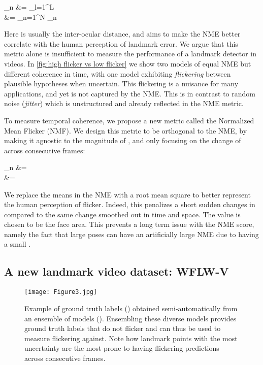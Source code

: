 \documentclass[10pt,twocolumn,letterpaper]{article}
\newcommand\norm[1]{\left\lVert#1\right\rVert}
\def\vr{{\bm{r}}}
\begin{document}
_{n} &=  \sum_{l=1}^{L} \frac{\norm{\vr_{n,l}}}{d_0} \\
 &=  \sum_{n=1}^N _{n}
\label{eq: NME}

Here  is usually the inter-ocular distance, and aims to make the NME better correlate with the human perception of landmark error. We argue that this metric alone is insufficient to measure the performance of a landmark detector in videos. In \cref{fig:high flicker vs low flicker} we show two models of equal NME but different coherence in time, with one model exhibiting \textit{flickering} between plausible hypotheses when uncertain. This flickering is a nuisance for many applications, and yet is not captured by the NME. This is in contrast to random noise (\textit{jitter}) which is unstructured and already reflected in the NME metric. 

To measure temporal coherence, we propose a new metric called the Normalized Mean Flicker (NMF). We design this metric to be orthogonal to the NME, by making it agnostic to the magnitude of , and only focusing on the change of  across consecutive frames:

_{n} &= \sqrt{\frac{1}{L} \sum_{l=1}^{L} \frac{\norm{\vr_{n,l} - \vr_{n-1, l}}^2}{d^{2}_1}} \\
 &= 
\label{eq: NMF}

We replace the means in the NME with a root mean square to better represent the human perception of flicker. Indeed, this penalizes a short sudden changes in  compared to the same change smoothed out in time and space. The value  is chosen to be the face area. This prevents a long term issue with the NME score, namely the fact that large poses can have an artificially large NME due to having a small .

\subsection{A new landmark video dataset: WFLW-V}


\begin{figure*}[ht!]
  \centering
   \texttt{[image: Figure3.jpg]}
   \caption{Example of ground truth labels (\textcolor{green}{\textbullet}) obtained semi-automatically from an ensemble of  models (\textcolor{red}{}). Ensembling these diverse models provides ground truth labels that do not flicker and can thus be used to measure flickering against. Note how landmark points with the most uncertainty are the most prone to having flickering predictions across consecutive frames.}
   \label{fig:examples of labelled videos}
\end{figure*}
\end{document}
